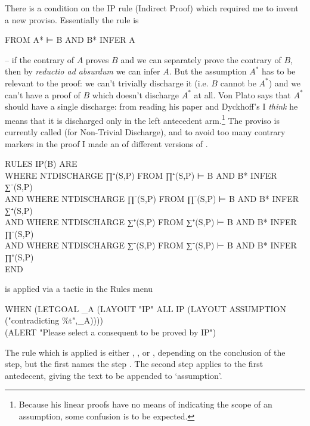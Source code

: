 There is a condition on the IP rule (Indirect Proof) which required me to invent a new proviso. Essentially the rule is
\begin{japeish}
FROM A* ⊢ B AND B* INFER A
\end{japeish}
-- if the contrary of $A$ proves $B$ and we can separately prove the contrary of $B$, then by \emph{reductio ad absurdum} we can infer $A$. But the assumption $A^{*}$ has to be relevant to the proof: we can't trivially discharge it (i.e. $B$ cannot be $A^{*}$) and we can't have a proof of $B$ which doesn't discharge $A^{*}$ at all. Von Plato says that $A^{*}$ should have a single discharge: from reading his paper and Dyckhoff's I \emph{think} he means that it is discharged only in the left antecedent arm.\footnote{Because his linear proofs have no means of indicating the scope of an assumption, some confusion is to be expected.} The proviso is currently called  (for Non-Trivial Discharge), and to avoid too many contrary markers in the proof I made an  of different versions of .
\begin{japeish}
RULES IP(B) ARE \\
\tab\tab WHERE NTDISCHARGE ∏⁺(S,P) FROM ∏⁺(S,P) ⊢ B AND B* INFER ∑⁻(S,P) \\ 
 AND WHERE NTDISCHARGE ∏⁻(S,P) FROM ∏⁻(S,P) ⊢ B AND B* INFER ∑⁺(S,P)  \\
 AND WHERE NTDISCHARGE ∑⁺(S,P) FROM ∑⁺(S,P) ⊢ B AND B* INFER ∏⁻(S,P)  \\
 AND WHERE NTDISCHARGE ∑⁻(S,P) FROM ∑⁻(S,P) ⊢ B AND B* INFER ∏⁺(S,P) \\
END
\end{japeish}
 is applied via a tactic in the Rules menu
\begin{japeish}
WHEN (LETGOAL \_A (LAYOUT "IP" ALL IP (LAYOUT ASSUMPTION ("contradicting \%t",\_A)))) \\
\tab\tab\tab                  (ALERT "Please select a consequent to be proved by IP") \\
\end{japeish}
The rule which is applied is either , ,  or , depending on the conclusion of the step, but the first  names the step . The second step applies  to the first antedecent, giving the text to be appended to `assumption'.

